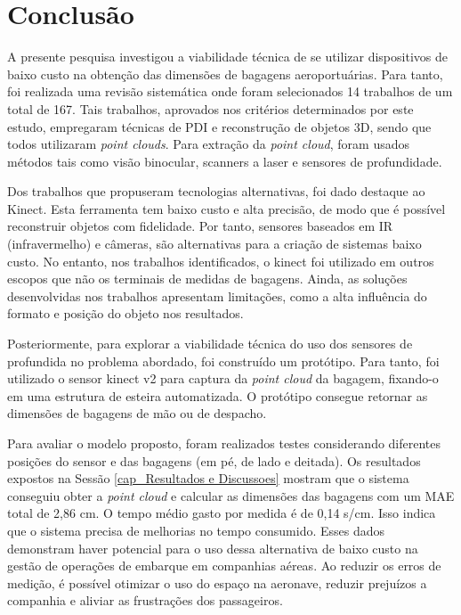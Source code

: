 %
\chapter[Conclusão]{Conclusão}
\label{cap_conclusao}

    A presente pesquisa investigou a viabilidade técnica de se utilizar dispositivos de baixo custo na obtenção das dimensões de bagagens aeroportuárias. Para tanto, foi realizada uma revisão sistemática onde foram selecionados 14 trabalhos de um total de 167. Tais trabalhos, aprovados nos critérios determinados por este estudo, empregaram técnicas de PDI e reconstrução de objetos 3D, sendo que todos utilizaram \textit{point clouds}. Para extração da \textit{point cloud}, foram usados métodos tais como visão binocular, scanners a laser e sensores de profundidade. 
    
    Dos trabalhos que propuseram tecnologias alternativas, foi dado destaque ao Kinect. Esta ferramenta tem baixo custo e alta precisão, de modo que é possível reconstruir objetos com fidelidade. Por tanto, sensores baseados em IR (infravermelho) e câmeras, são alternativas para a criação de sistemas baixo custo. No entanto, nos trabalhos identificados, o kinect foi utilizado em outros escopos que não os terminais de medidas de bagagens. Ainda, as soluções desenvolvidas nos trabalhos apresentam limitações, como a alta influência do formato e posição do objeto nos resultados.
    
    Posteriormente, para explorar a viabilidade técnica do uso dos sensores de profundida no problema abordado, foi construído um protótipo. Para tanto, foi utilizado o sensor kinect v2 para captura da \textit{point cloud} da bagagem, fixando-o em uma estrutura de esteira automatizada. O protótipo consegue retornar as dimensões de bagagens de mão ou de despacho. 
    
    Para avaliar o modelo proposto, foram realizados testes considerando diferentes posições do sensor e das bagagens (em pé, de lado e deitada). Os resultados expostos na Sessão \ref{cap_Resultados e Discussoes} mostram que o sistema conseguiu obter a \textit{point cloud} e calcular as dimensões das bagagens com um MAE total de 2,86 cm. O tempo médio gasto por medida é de 0,14 s/cm. Isso indica que o sistema precisa de melhorias no tempo consumido. Esses dados demonstram haver potencial para o uso dessa alternativa de baixo custo na gestão de operações de embarque em companhias aéreas. Ao reduzir os erros de medição, é possível otimizar o uso do espaço na aeronave, reduzir prejuízos a companhia e aliviar as frustrações dos passageiros.

